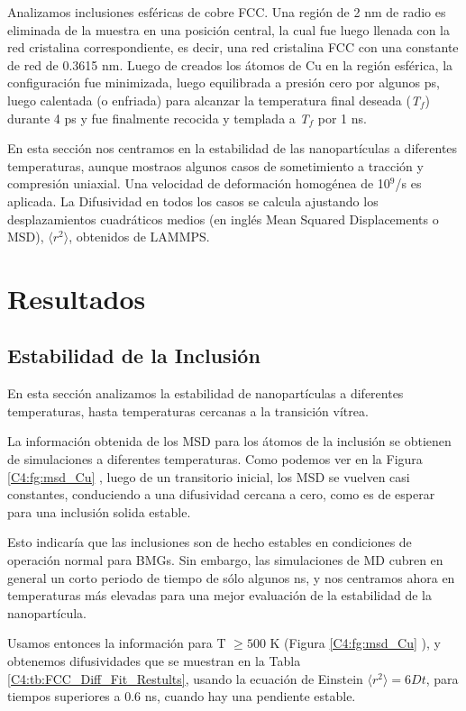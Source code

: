 Analizamos inclusiones esféricas de cobre FCC. Una región de 2 nm de radio es eliminada de la muestra en una posición central, la cual fue luego llenada con la red cristalina correspondiente, es decir, una red cristalina FCC con una constante de red de 0.3615 nm. Luego de creados los átomos de Cu en la región esférica, la configuración fue minimizada, luego equilibrada a presión cero por algunos ps, luego calentada (o enfriada) para alcanzar la temperatura final deseada (\textit{T$_{f}$}) durante 4 ps y fue finalmente recocida y templada a \textit{T$_{f}$} por 1 ns.

En esta sección nos centramos en la estabilidad de las nanopartículas a diferentes temperaturas, aunque mostraos algunos casos de sometimiento a tracción y compresión uniaxial. Una velocidad de deformación homogénea de 10$^{9}$/s es aplicada. La Difusividad en todos los casos se calcula ajustando los desplazamientos cuadráticos medios (en inglés Mean Squared Displacements o MSD), $\langle r^{2}\rangle$, obtenidos de LAMMPS.

\section{Resultados}

\subsection{Estabilidad de la Inclusión}

En esta sección analizamos la estabilidad de nanopartículas a diferentes temperaturas, hasta temperaturas cercanas a la transición vítrea.

La información obtenida de los MSD para los átomos de la inclusión se obtienen de simulaciones a diferentes temperaturas. Como podemos ver en la Figura \ref{C4:fg:msd_Cu} , luego de un transitorio inicial, los MSD se vuelven casi constantes, conduciendo a una difusividad cercana a cero, como es de esperar para una inclusión solida estable.

Esto indicaría que las inclusiones son de hecho estables en condiciones de operación normal para BMGs. Sin embargo, las simulaciones de MD cubren en general un corto periodo de tiempo de sólo algunos ns, y nos centramos ahora en temperaturas más elevadas para una mejor evaluación de la estabilidad de la nanopartícula.

Usamos entonces la información para T $ \geq 500$ K (Figura \ref{C4:fg:msd_Cu} ), y obtenemos difusividades que se muestran en la Tabla \ref{C4:tb:FCC_Diff_Fit_Restults}, usando la ecuación de Einstein $\langle r^{2}\rangle = 6Dt$, para tiempos superiores a 0.6 ns, cuando hay una pendiente estable.

